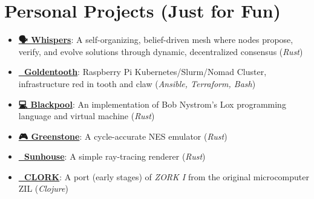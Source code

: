\documentclass[letterpaper,11pt]{article}
\newcommand{\resumeSubHeadingListStart}{\begin{itemize}[leftmargin=0.15in, label={}]}
\newcommand{\resumeSubHeadingListEnd}{\end{itemize}}
\newenvironment{resumeListicle}{
    \small        %
    \setlength{\itemsep}{0pt}
    \setlength{\parskip}{0pt}
}{}
\newcommand{\resumeListicleStart}{\begin{resumeListicle}}
\newcommand{\resumeListicleEnd}{\end{resumeListicle}}
\newcommand{\resumeSideProjectListicleItem}[4]{%
  \item \textbf{\href{#1}{#2}}: #3 (\emph{#4})%
}
\begin{document}
\section{Personal Projects (Just for Fun)}
  \resumeSubHeadingListStart
    \resumeListicleStart
      \resumeSideProjectListicleItem{https://github.com/ndouglas/whispers/}{🗣️ Whispers}{A self-organizing, belief-driven mesh where nodes propose, verify, and evolve solutions through dynamic, decentralized consensus}{Rust} \\
      \resumeSideProjectListicleItem{https://github.com/goldentooth/}{🦷 Goldentooth}{Raspberry Pi Kubernetes/Slurm/Nomad Cluster, infrastructure red in tooth and claw}{Ansible, Terraform, Bash} \\
      \resumeSideProjectListicleItem{https://github.com/ndouglas/blackpool/}{💻 Blackpool}{An implementation of Bob Nystrom's Lox programming language and virtual machine}{Rust} \\
      \resumeSideProjectListicleItem{https://github.com/ndouglas/greenstone/}{🎮 Greenstone}{A cycle-accurate NES emulator}{Rust} \\
      \resumeSideProjectListicleItem{https://github.com/ndouglas/sunhouse/}{🌈 Sunhouse}{A simple ray-tracing renderer}{Rust} \\
      \resumeSideProjectListicleItem{https://github.com/ndouglas/clork/}{📜 CLORK}{A port (early stages) of \emph{ZORK I} from the original microcomputer ZIL}{Clojure} \\
    \resumeListicleEnd
  \resumeSubHeadingListEnd

\end{document}
